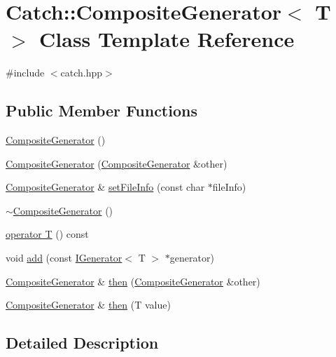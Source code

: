 \hypertarget{class_catch_1_1_composite_generator}{}\section{Catch\+:\+:Composite\+Generator$<$ T $>$ Class Template Reference}
\label{class_catch_1_1_composite_generator}


{\ttfamily \#include $<$catch.\+hpp$>$}

\subsection*{Public Member Functions}
\begin{DoxyCompactItemize}
\item 
\hyperlink{class_catch_1_1_composite_generator_a923398b140371d1783858766864a1af5}{Composite\+Generator} ()
\item 
\hyperlink{class_catch_1_1_composite_generator_a21a7070a00e4a6fe021294c356692692}{Composite\+Generator} (\hyperlink{class_catch_1_1_composite_generator}{Composite\+Generator} \&other)
\item 
\hyperlink{class_catch_1_1_composite_generator}{Composite\+Generator} \& \hyperlink{class_catch_1_1_composite_generator_ac3c57cf4ca5472f440bf71e2936bcd4a}{set\+File\+Info} (const char $\ast$file\+Info)
\item 
\hyperlink{class_catch_1_1_composite_generator_a5766205abd7004c508c20ddbb5e5555e}{$\sim$\+Composite\+Generator} ()
\item 
\hyperlink{class_catch_1_1_composite_generator_a83d6c941e2e735b9528e6e832f7b76e7}{operator T} () const
\item 
void \hyperlink{class_catch_1_1_composite_generator_af3774d42ad2d3453d089ca599efe0517}{add} (const \hyperlink{struct_catch_1_1_i_generator}{I\+Generator}$<$ T $>$ $\ast$generator)
\item 
\hyperlink{class_catch_1_1_composite_generator}{Composite\+Generator} \& \hyperlink{class_catch_1_1_composite_generator_a2e03f42df85cdd238aabd77a80b075d5}{then} (\hyperlink{class_catch_1_1_composite_generator}{Composite\+Generator} \&other)
\item 
\hyperlink{class_catch_1_1_composite_generator}{Composite\+Generator} \& \hyperlink{class_catch_1_1_composite_generator_aefdc11bcfccdf07d2db5f0da3ed8758c}{then} (T value)
\end{DoxyCompactItemize}


\subsection{Detailed Description}
